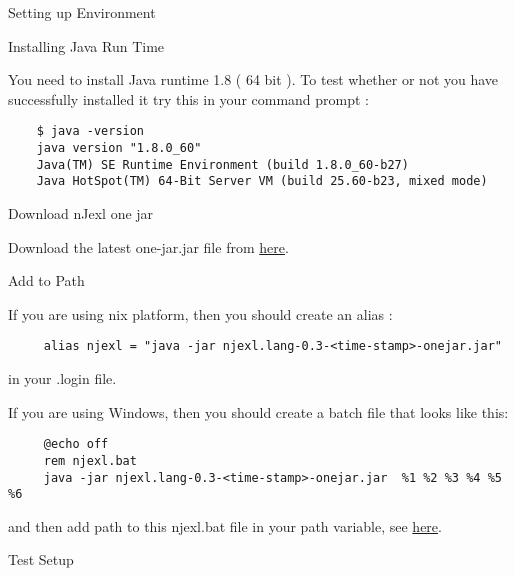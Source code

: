 \begin{section}{Setting up Environment}

\begin{subsection}{Installing Java Run Time}

 You need to install Java runtime 1.8 ( 64 bit ).
 To test whether or not you have successfully installed it try this 
 in your command prompt :

\begin{lstlisting}
    $ java -version
    java version "1.8.0_60"
    Java(TM) SE Runtime Environment (build 1.8.0_60-b27)
    Java HotSpot(TM) 64-Bit Server VM (build 25.60-b23, mixed mode)
\end{lstlisting}

\end{subsection}

\begin{subsection}{Download nJexl one jar}

Download the latest one-jar.jar file from \href{https://oss.sonatype.org/content/repositories/snapshots/com/github/nmondal/njexl.lang/0.3-SNAPSHOT/}{here}.

\end{subsection}

\begin{subsection}{Add to Path}

If you are using \*nix platform, then you should create an alias :

\begin{lstlisting}
     alias njexl = "java -jar njexl.lang-0.3-<time-stamp>-onejar.jar" 
\end{lstlisting}

in your .login file.

If you are using Windows, then you should create a batch file that looks like this:

\begin{lstlisting}
     @echo off
     rem njexl.bat 
     java -jar njexl.lang-0.3-<time-stamp>-onejar.jar  %1 %2 %3 %4 %5 %6

\end{lstlisting}

and then add path to this njexl.bat file in your path variable, see 
\href{https://www.google.co.in/search?client=safari&rls=en&q=adding+path+in+windows&ie=UTF-8&oe=UTF-8&gfe_rd=cr&ei=EWpIVqjUJ-PI8AfWm4GgBQ}{here}.

\end{subsection}

\begin{subsection}{Test Setup}


\end{subsection}
\end{section}
